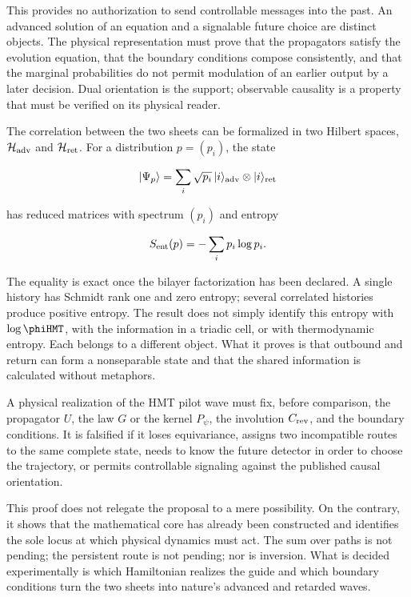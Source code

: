 This provides no authorization to send controllable messages into the past.
An advanced solution of an equation and a signalable future choice are distinct
objects. The physical representation must prove that the propagators satisfy
the evolution equation, that the boundary conditions compose
consistently, and that the marginal probabilities do not permit modulation of an
earlier output by a later decision. Dual orientation is the
support; observable causality is a property that must be verified on its
physical reader.

The correlation between the two sheets can be formalized in two Hilbert spaces,
\(\mathcal H_{\rm adv}\) and \(\mathcal H_{\rm ret}\). For a distribution
\(p=(p_i)\), the state

\[
  |\Psi_p\rangle
  =
  \sum_i\sqrt{p_i}\,
  |i\rangle_{\rm adv}\otimes|i\rangle_{\rm ret}
\]

has reduced matrices with spectrum \((p_i)\) and entropy

\[
  S_{\rm ent}(p)=-\sum_i p_i\log p_i.
\]

The equality is exact once the bilayer factorization has been declared. A single history
has Schmidt rank one and zero entropy; several correlated histories
produce positive entropy. The result does not simply identify this entropy with
\(\log\phiHMT\), with the information in a triadic cell, or with thermodynamic
entropy. Each belongs to a different object. What it proves is that
outbound and return can form a nonseparable state and that the shared information
is calculated without metaphors.

\begin{test}
A physical realization of the HMT pilot wave must fix, before comparison, the propagator \(U\), the law \(G\) or the kernel \(P_\psi\), the involution \(C_{\rm rev}\), and the boundary conditions. It is falsified if it loses equivariance, assigns two incompatible routes to the same complete state, needs to know the future detector in order to choose the trajectory, or permits controllable signaling against the published causal orientation.
\end{test}

This proof does not relegate the proposal to a mere possibility. On the contrary, it shows that the mathematical core has already been constructed and identifies the sole locus at which physical dynamics must act. The sum over paths is not pending; the persistent route is not pending; nor is inversion. What is decided experimentally is which Hamiltonian realizes the guide and which boundary conditions turn the two sheets into nature's advanced and retarded waves.

